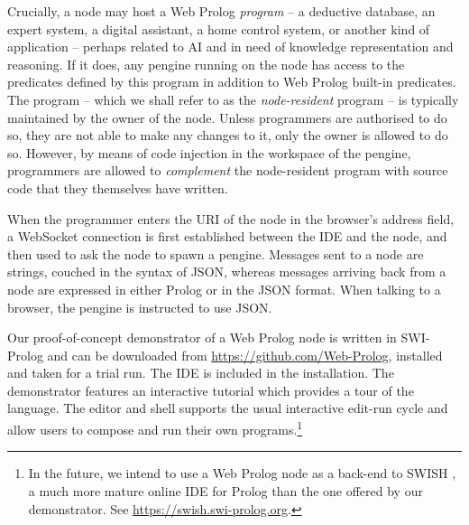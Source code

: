 \documentclass{tlp}
\begin{document}
Crucially, a node may host a Web Prolog \textit{program} -- a deductive database, an expert system, a digital assistant, a home control system, or another kind of application -- perhaps related to AI and in need of knowledge representation and reasoning. If it does, any pengine running on the node has access to the predicates defined by this program in addition to Web Prolog built-in predicates. The program -- which we shall refer to as the \textit{node-resident} program -- is typically maintained by the owner of the node. Unless programmers are authorised to do so, they are not able to make any changes to it, only the owner is allowed to do so. However, by means of code injection in the workspace of the pengine, programmers are allowed to \textit{complement} the node-resident program with source code that they themselves have written. 

When the programmer enters the URI of the node in the browser's address field, a WebSocket connection is first established between the IDE and the node, and then used to ask the node to spawn a pengine. Messages sent to a node are strings, couched in the syntax of JSON, whereas messages arriving back from a node are expressed in either Prolog or in the JSON format. When talking to a browser, the pengine is instructed to use JSON. 

Our proof-of-concept demonstrator of a Web Prolog node is written in SWI-Prolog \cite{wielemaker:2011:tplp} and can be downloaded from \url{https://github.com/Web-Prolog}, installed and taken for a trial run. The IDE is included in the installation. The demonstrator features an interactive tutorial which provides a tour of the language. The editor and shell supports the usual interactive edit-run cycle and allow users to compose and run their own programs.\footnote{In the future, we intend to use a Web Prolog node as a back-end to SWISH \cite{DBLP:journals/corr/abs-1808-08042}, a much more mature online IDE for Prolog than the one offered by our demonstrator. See \url{https://swish.swi-prolog.org}.}


\end{document}
